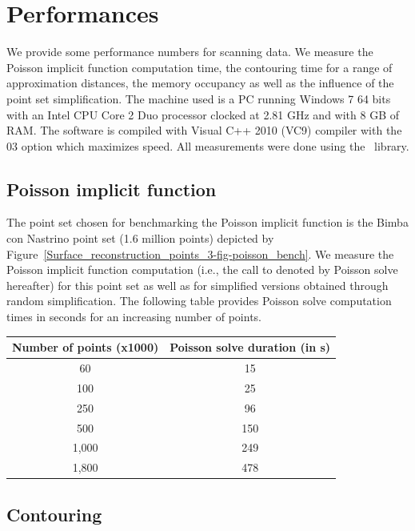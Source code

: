 \section{Performances}
\label{surface_reconstruction_section_performances}

We provide some performance numbers for scanning data. We measure the Poisson implicit function computation time, the contouring time for a range of approximation distances, the memory occupancy as well as the influence of the point set simplification. The machine used is a PC running Windows 7 64 bits with an Intel CPU Core 2 Duo processor clocked at 2.81 GHz and with 8 GB of RAM. The software is compiled with Visual C++ 2010 (VC9) compiler with the 03 option which maximizes speed.  All measurements were done using the \ccThirdPartyEigen\ library.


\subsection{Poisson implicit function}

The point set chosen for benchmarking the Poisson implicit function is the Bimba con Nastrino point set (1.6 million points) depicted by Figure~\ref{Surface_reconstruction_points_3-fig-poisson_bench}. We measure the Poisson implicit function computation (i.e., the call to  denoted by Poisson solve hereafter) for this point set as well as for simplified versions obtained through random simplification. The following table provides Poisson solve computation times in seconds for an increasing number of points.

\begin{tabular}{|c|c|}
  \hline
  Number of points (x1000) & Poisson solve duration (in s) \\
  \hline
  60                         & 15 \\
  100                        & 25 \\
  250                        & 96 \\
  500                        & 150 \\
  1,000                       & 249 \\
  1,800                       & 478 \\
  \hline
\end{tabular}



\subsection{Contouring}

